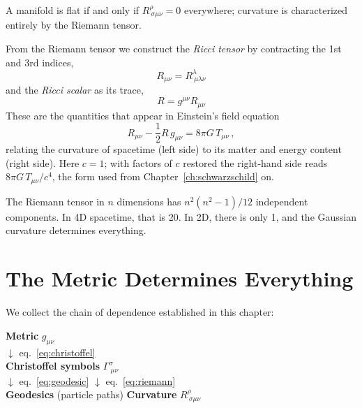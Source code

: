 A manifold is flat if and only if $R^\rho_{\ \sigma\mu\nu} = 0$
everywhere; curvature is characterized entirely by the Riemann tensor.

From the Riemann tensor we construct the \emph{Ricci tensor} by
contracting the 1st and 3rd indices,
\begin{equation}
    R_{\mu\nu} = R^\lambda_{\ \mu\lambda\nu}
    \label{eq:ricci_tensor}
\end{equation}
and the \emph{Ricci scalar} as its trace,
\begin{equation}
    R = g^{\mu\nu} R_{\mu\nu}
    \label{eq:ricci_scalar}
\end{equation}
These are the quantities that appear in Einstein's field equation
\begin{equation}
    R_{\mu\nu} - \frac{1}{2} R\, g_{\mu\nu} = 8\pi G\, T_{\mu\nu} \,,
    \label{eq:einstein_field_eq}
\end{equation}
relating the curvature of spacetime (left side) to its matter and energy
content (right side).  Here $c = 1$; with factors of $c$ restored the
right-hand side reads $8\pi G\, T_{\mu\nu}/c^4$, the form used from
Chapter~\ref{ch:schwarzschild} on.

\begin{remark}
The Riemann tensor in $n$ dimensions has $n^2(n^2 - 1)/12$ independent
components.  In 4D spacetime, that is 20.  In 2D, there is only 1, and
the Gaussian curvature determines everything.
\end{remark}


\section{The Metric Determines Everything}
\label{sec:metric_determines}

We collect the chain of dependence established in this chapter:
\begin{center}
\textbf{Metric} $g_{\mu\nu}$ \\
$\downarrow$ eq.~\eqref{eq:christoffel} \\
\textbf{Christoffel symbols} $\Gamma^\sigma_{\ \mu\nu}$ \\
$\downarrow$ eq.~\eqref{eq:geodesic} \qquad $\downarrow$ eq.~\eqref{eq:riemann} \\
\textbf{Geodesics} (particle paths) \qquad \textbf{Curvature} $R^\rho_{\ \sigma\mu\nu}$
\end{center}

